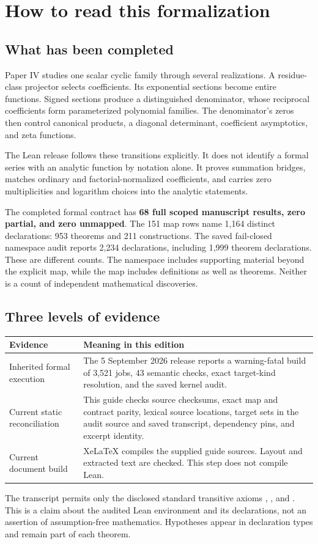 \section{How to read this formalization}
\subsection{What has been completed}
Paper IV studies one scalar cyclic family through several realizations. A residue-class projector selects coefficients. Its exponential sections become entire functions. Signed sections produce a distinguished denominator, whose reciprocal coefficients form parameterized polynomial families. The denominator's zeros then control canonical products, a diagonal determinant, coefficient asymptotics, and zeta functions.

The Lean release follows these transitions explicitly. It does not identify a formal series with an analytic function by notation alone. It proves summation bridges, matches ordinary and factorial-normalized coefficients, and carries zero multiplicities and logarithm choices into the analytic statements.

The completed formal contract has \textbf{68 full scoped manuscript results, zero partial, and zero unmapped}. The 151 map rows name 1,164 distinct declarations: 953 theorems and 211 constructions. The saved fail-closed namespace audit reports 2,234 declarations, including 1,999 theorem declarations. These are different counts. The namespace includes supporting material beyond the explicit map, while the map includes definitions as well as theorems. Neither is a count of independent mathematical discoveries.

\subsection{Three levels of evidence}
\begin{longtable}{p{}p{}}
\toprule Evidence & Meaning in this edition \\ \midrule\endhead
Inherited formal execution & The 5 September 2026 release reports a warning-fatal build of 3,521 jobs, 43 semantic checks, exact target-kind resolution, and the saved kernel audit. \\
Current static reconciliation & This guide checks source checksums, exact map and contract parity, lexical source locations, target sets in the audit source and saved transcript, dependency pins, and excerpt identity. \\
Current document build & XeLaTeX compiles the supplied guide sources. Layout and extracted text are checked. This step does not compile Lean. \\
\bottomrule
\end{longtable}
The transcript permits only the disclosed standard transitive axioms , , and . This is a claim about the audited Lean environment and its declarations, not an assertion of assumption-free mathematics. Hypotheses appear in declaration types and remain part of each theorem.

